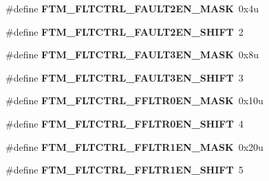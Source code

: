\begin{DoxyCompactItemize}
\item 
\hypertarget{group___f_t_m___register___masks_ga1e35c0281db74fb68969c15377596ea5}{}\#define {\bfseries F\+T\+M\+\_\+\+F\+L\+T\+C\+T\+R\+L\+\_\+\+F\+A\+U\+L\+T2\+E\+N\+\_\+\+M\+A\+S\+K}~0x4u\label{group___f_t_m___register___masks_ga1e35c0281db74fb68969c15377596ea5}

\item 
\hypertarget{group___f_t_m___register___masks_gaf41dd0966742f642b633ce812a13bfc7}{}\#define {\bfseries F\+T\+M\+\_\+\+F\+L\+T\+C\+T\+R\+L\+\_\+\+F\+A\+U\+L\+T2\+E\+N\+\_\+\+S\+H\+I\+F\+T}~2\label{group___f_t_m___register___masks_gaf41dd0966742f642b633ce812a13bfc7}

\item 
\hypertarget{group___f_t_m___register___masks_ga5b3b4ac103a4459ae5ef09d3d83a2352}{}\#define {\bfseries F\+T\+M\+\_\+\+F\+L\+T\+C\+T\+R\+L\+\_\+\+F\+A\+U\+L\+T3\+E\+N\+\_\+\+M\+A\+S\+K}~0x8u\label{group___f_t_m___register___masks_ga5b3b4ac103a4459ae5ef09d3d83a2352}

\item 
\hypertarget{group___f_t_m___register___masks_ga19ffec80742795f21edc0cb15a74cff6}{}\#define {\bfseries F\+T\+M\+\_\+\+F\+L\+T\+C\+T\+R\+L\+\_\+\+F\+A\+U\+L\+T3\+E\+N\+\_\+\+S\+H\+I\+F\+T}~3\label{group___f_t_m___register___masks_ga19ffec80742795f21edc0cb15a74cff6}

\item 
\hypertarget{group___f_t_m___register___masks_ga08d69ad3bf701debb5a53bfadbc7031d}{}\#define {\bfseries F\+T\+M\+\_\+\+F\+L\+T\+C\+T\+R\+L\+\_\+\+F\+F\+L\+T\+R0\+E\+N\+\_\+\+M\+A\+S\+K}~0x10u\label{group___f_t_m___register___masks_ga08d69ad3bf701debb5a53bfadbc7031d}

\item 
\hypertarget{group___f_t_m___register___masks_gae70106a7899ed40bc3d6252a1826e0eb}{}\#define {\bfseries F\+T\+M\+\_\+\+F\+L\+T\+C\+T\+R\+L\+\_\+\+F\+F\+L\+T\+R0\+E\+N\+\_\+\+S\+H\+I\+F\+T}~4\label{group___f_t_m___register___masks_gae70106a7899ed40bc3d6252a1826e0eb}

\item 
\hypertarget{group___f_t_m___register___masks_ga0f14665d0a31ab1137dc4988671225a2}{}\#define {\bfseries F\+T\+M\+\_\+\+F\+L\+T\+C\+T\+R\+L\+\_\+\+F\+F\+L\+T\+R1\+E\+N\+\_\+\+M\+A\+S\+K}~0x20u\label{group___f_t_m___register___masks_ga0f14665d0a31ab1137dc4988671225a2}

\item 
\hypertarget{group___f_t_m___register___masks_gaa027617739dc7dbcc2f709d42941257e}{}\#define {\bfseries F\+T\+M\+\_\+\+F\+L\+T\+C\+T\+R\+L\+\_\+\+F\+F\+L\+T\+R1\+E\+N\+\_\+\+S\+H\+I\+F\+T}~5\label{group___f_t_m___register___masks_gaa027617739dc7dbcc2f709d42941257e}


\end{DoxyCompactItemize}
